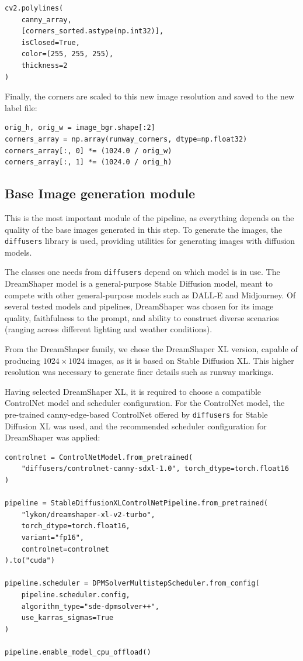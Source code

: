 \begin{lstlisting}
cv2.polylines(
    canny_array,
    [corners_sorted.astype(np.int32)],
    isClosed=True,
    color=(255, 255, 255),
    thickness=2
)
\end{lstlisting}

Finally, the corners are scaled to this new image resolution and saved to the new label file:

\begin{lstlisting}
orig_h, orig_w = image_bgr.shape[:2]
corners_array = np.array(runway_corners, dtype=np.float32)
corners_array[:, 0] *= (1024.0 / orig_w)
corners_array[:, 1] *= (1024.0 / orig_h)
\end{lstlisting}

\subsection{Base Image generation module}

This is the most important module of the pipeline, as everything depends on the quality of the base images generated in this step. 
To generate the images, the \texttt{diffusers} library \cite{noauthor_diffusers_nodate} is used, providing utilities for generating images with diffusion models.

The classes one needs from \texttt{diffusers} depend on which model is in use. 
The DreamShaper model \cite{noauthor_dreamshaper_2025} is a general-purpose Stable Diffusion model, meant to compete with other general-purpose models such as DALL-E and Midjourney. 
Of several tested models and pipelines, DreamShaper was chosen for its image quality, faithfulness to the prompt, and ability to construct diverse scenarios (ranging across different lighting and weather conditions).

From the DreamShaper family, we chose the DreamShaper XL version, capable of producing $1024 \times 1024$ images, as it is based on Stable Diffusion XL. 
This higher resolution was necessary to generate finer details such as runway markings.

Having selected DreamShaper XL, it is required to choose a compatible ControlNet
model and scheduler configuration. 
For the ControlNet model, the pre-trained canny-edge-based ControlNet offered by \texttt{diffusers} for Stable Diffusion XL was used, and the recommended scheduler configuration for DreamShaper was applied:

\begin{lstlisting}
controlnet = ControlNetModel.from_pretrained(
    "diffusers/controlnet-canny-sdxl-1.0", torch_dtype=torch.float16
)

pipeline = StableDiffusionXLControlNetPipeline.from_pretrained(
    "lykon/dreamshaper-xl-v2-turbo",
    torch_dtype=torch.float16,
    variant="fp16",
    controlnet=controlnet
).to("cuda")

pipeline.scheduler = DPMSolverMultistepScheduler.from_config(
    pipeline.scheduler.config,
    algorithm_type="sde-dpmsolver++",
    use_karras_sigmas=True
)

pipeline.enable_model_cpu_offload()
\end{lstlisting}

